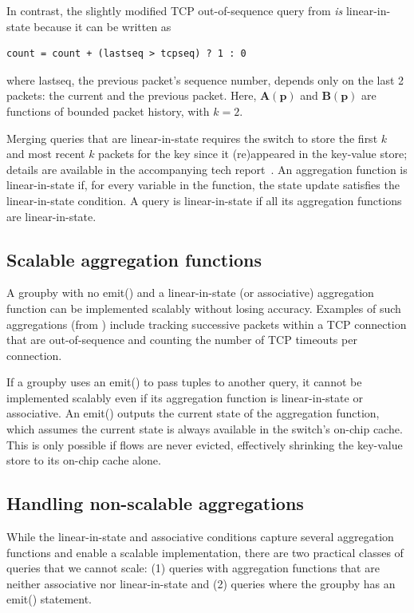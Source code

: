 In contrast, the slightly modified TCP out-of-sequence query from  {\em is}
linear-in-state because it can be written as
\begin{lstlisting}
count = count + (lastseq > tcpseq) ? 1 : 0
\end{lstlisting}
where {\ct lastseq}, the previous packet's sequence number, depends only on the last 2 packets: the current and the previous packet. Here,
$\boldsymbol{A}(\mathbf{p})$ and $\boldsymbol{B}(\mathbf{p})$ are functions of bounded packet history,
with $k = 2$.

Merging queries that are linear-in-state requires the switch to store
the first $k$ and most recent $k$ packets
for the key since it (re)appeared in the key-value store; details are
available in the accompanying tech report~\cite{theory-tr}.
An aggregation function is linear-in-state
if, for every variable in the function, the state update
satisfies the linear-in-state condition. A query is linear-in-state
if all its aggregation functions are linear-in-state.

\subsection{Scalable aggregation functions}
\label{sec:scalable}
A {\ct groupby} with no {\ct emit()} and a linear-in-state (or associative) aggregation function
can be implemented scalably without losing accuracy. Examples of such
aggregations (from ) include tracking successive
packets within a TCP connection that are out-of-sequence and counting the
number of TCP timeouts per connection.
%

 If a
{\ct groupby} uses an {\ct emit()} to pass tuples to another query, it cannot be
implemented scalably even if its aggregation function is linear-in-state or associative. An {\ct emit()} outputs the current state of the
aggregation function, which assumes the current state is always available in
the switch's on-chip cache. This is only possible if flows are never evicted,
effectively shrinking the key-value store to its on-chip cache alone.

\subsection{Handling non-scalable aggregations}
\label{sec:workaround-nonscalable}
While the linear-in-state and associative conditions capture several
aggregation functions and enable a scalable implementation, there are two
practical classes of queries that we cannot scale: (1) queries with aggregation
functions that are neither associative nor linear-in-state and (2) queries where
the groupby has an {\ct emit()} statement.

